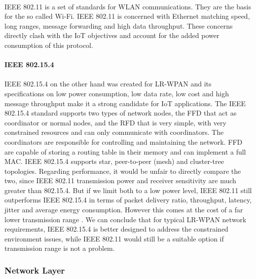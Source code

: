 \paragraph{}
IEEE 802.11 is a set of standards for \ac{WLAN} communications. They are the basis for the so called Wi-Fi. IEEE 802.11 is concerned with Ethernet matching speed, long ranges, message forwarding and high data throughput. These concerns directly clash with the \ac{IoT} objectives and account for the added power consumption of this protocol.

\paragraph{\textbf{IEEE 802.15.4}}
\paragraph{}
IEEE 802.15.4 on the other hand was created for \ac{LR-WPAN} and its specifications on low power consumption, low data rate, low cost and high message throughput make it a strong candidate for \ac{IoT} applications.
	The IEEE 802.15.4 standard supports two types of network nodes, the \ac{FFD} that act as coordinator or normal nodes, and the \ac{RFD} that is very simple, with very constrained resources and can only communicate with coordinators. The coordinators are responsible for controlling and maintaining the network. \ac{FFD} are capable of storing a routing table in their memory and can implement a full \ac{MAC}.
	IEEE 802.15.4 supports star, peer-to-peer (mesh) and cluster-tree topologies.
	Regarding performance, it would be unfair to directly compare the two, since IEEE 802.11 transmission power and receiver sensitivity are much greater than 802.15.4. But if we limit both to a low power level, IEEE 802.11 still outperforms IEEE 802.15.4 in terms of packet delivery ratio, throughput, latency, jitter and average energy consumption. However this comes at the cost of a far lower transmission range \cite{Transmission2011}.
	We can conclude that for typical \ac{LR-WPAN} network requirements, IEEE 802.15.4 is better designed to address the constrained environment issues, while IEEE 802.11 would still be a suitable option if transmission range is not a problem.

\subsubsection{Network Layer}
\label{sec:network_layer}

